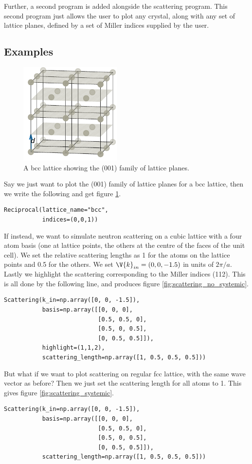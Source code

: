\documentclass[main.tex]{subfiles}
\begin{document}
	 
	Further, a second program is added alongside the scattering program. This second program just allows the user to plot any crystal, along with any set of lattice planes, defined by a set of Miller indices supplied by the user.
	
	\subsection{Examples}
	\begin{figure}
		\includegraphics[width=2in]{figures/lattice_planes_1.pdf}
		\caption{A bcc lattice showing the (001) family of lattice planes.}
		\label{fig:lattice_planes}
	\end{figure}
	Say we just want to plot the (001) family of lattice planes for a bcc lattice, then we write the following and get figure \ref{fig:lattice_planes}.
\begin{lstlisting}
Reciprocal(lattice_name="bcc",
		   indices=(0,0,1))
\end{lstlisting}
	If instead, we want to simulate neutron scattering on a cubic lattice with a four atom basis (one at lattice points, the others at the centre of the faces of the unit cell). We set the relative scattering lengths as 1 for the atoms on the lattice points and 0.5 for the others. We set $ \V{k}_{in} = (0, 0, -1.5)$ in units of $ 2\pi/a $. Lastly we highlight the scattering corresponding to the Miller indices (112). This is all done by the following line, and produces figure \ref{fig:scattering_no_systemic}.
\begin{lstlisting}
Scattering(k_in=np.array([0, 0, -1.5]),
		   basis=np.array([[0, 0, 0], 
						   [0.5, 0.5, 0],
						   [0.5, 0, 0.5],
						   [0, 0.5, 0.5]]),	
		   highlight=(1,1,2),
		   scattering_length=np.array([1, 0.5, 0.5, 0.5]))
\end{lstlisting}
	But what if we want to plot scattering on regular fcc lattice, with the same wave vector as before? Then we just set the scattering length for all atoms to 1. This gives figure \ref{fig:scattering_systemic}.
\begin{lstlisting}
Scattering(k_in=np.array([0, 0, -1.5]),
		   basis=np.array([[0, 0, 0], 
						   [0.5, 0.5, 0],
						   [0.5, 0, 0.5],
						   [0, 0.5, 0.5]]),	
		   scattering_length=np.array([1, 0.5, 0.5, 0.5]))
\end{lstlisting}
	
\end{document}
